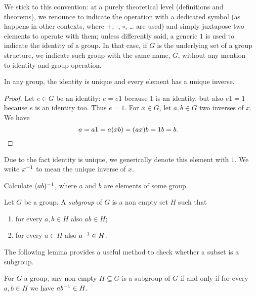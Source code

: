 We stick to this convention: at a purely theoretical level (definitions and theorems), we renounce to indicate the operation with a dedicated symbol (as happens in other contexts, where \(+\), \(\cdot\), \(\circ\), \dots{} are used) and simply juxtapose two elements to operate with them; unless differently said, a generic \(1\) is used to indicate the identity of a group. In that case, if \(G\) is the underlying set of a group structure, we indicate such group with the same name, \(G\), without any mention to identity and group operation.

\begin{proposition}
In any group, the identity is unique and every element has a unique inverse.
\end{proposition}

\begin{proof}
Let \(e \in G\) be an identity: \(e = e1\) because \(1\) is an identity, but also \(e1 = 1\) because \(e\) is an identity too. Thus \(e = 1\). For \(x \in G\), let \(a, b \in G\) two inverses of \(x\). We have
\[a = a 1 = a (x b) = (a x) b = 1 b = b.\qedhere\]
\end{proof}

Due to the fact identity is unique, we generically denote this element with \(1\). We write \(x^{-1}\) to mean the unique inverse of \(x\).

\begin{exercise}
Calculate \((ab)^{-1}\), where \(a\) and \(b\) are elements of some group.
\end{exercise}


\begin{definition}
Let \(G\) be a group. A {\em subgroup} of \(G\) is a non empty set \(H\) such that
\begin{enumerate}
\item for every \(a, b \in H\) also \(a b \in H\);
\item for every \(a \in H\) also \(a^{-1} \in H\).
\end{enumerate}
\end{definition}

The following lemma provides a useful method to check whether a subset is a subgroup.

\begin{lemma}\label{lem:SubgroupsCond}
For \(G\) a group, any non empty \(H \subseteq G\) is a subgroup of \(G\) if and only if for every \(a, b \in H\) we have \(a b^{-1} \in H\).
\end{lemma}


